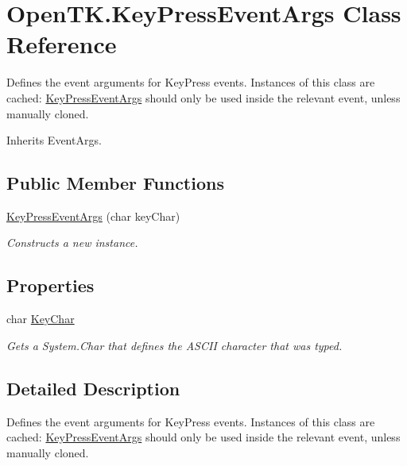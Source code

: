 \hypertarget{class_open_t_k_1_1_key_press_event_args}{\section{Open\-T\-K.\-Key\-Press\-Event\-Args Class Reference}
\label{class_open_t_k_1_1_key_press_event_args}
}


Defines the event arguments for Key\-Press events. Instances of this class are cached\-: \hyperlink{class_open_t_k_1_1_key_press_event_args}{Key\-Press\-Event\-Args} should only be used inside the relevant event, unless manually cloned.  




Inherits Event\-Args.

\subsection*{Public Member Functions}
\begin{DoxyCompactItemize}
\item 
\hyperlink{class_open_t_k_1_1_key_press_event_args_a9348dc20a7a43a9908ecfcac1f421236}{Key\-Press\-Event\-Args} (char key\-Char)
\begin{DoxyCompactList}\small\item\em Constructs a new instance. \end{DoxyCompactList}\end{DoxyCompactItemize}
\subsection*{Properties}
\begin{DoxyCompactItemize}
\item 
char \hyperlink{class_open_t_k_1_1_key_press_event_args_a3320dd1e5c1465d5abeec7de5f3ae0ce}{Key\-Char}
\begin{DoxyCompactList}\small\item\em Gets a System.\-Char that defines the A\-S\-C\-I\-I character that was typed. \end{DoxyCompactList}\end{DoxyCompactItemize}


\subsection{Detailed Description}
Defines the event arguments for Key\-Press events. Instances of this class are cached\-: \hyperlink{class_open_t_k_1_1_key_press_event_args}{Key\-Press\-Event\-Args} should only be used inside the relevant event, unless manually cloned. 



